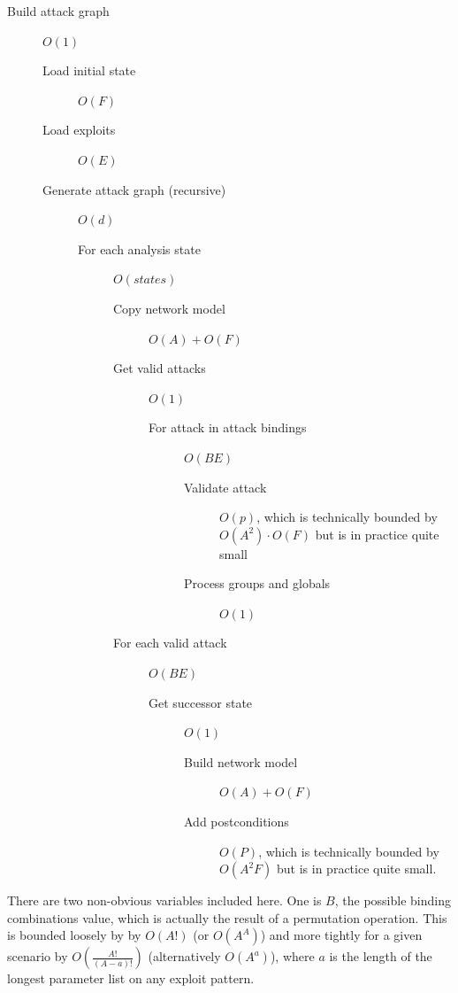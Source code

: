 \begin{description}
    \item[Build attack graph] $O(1)$
    \begin{description}
        \item[Load initial state] $O(F)$
        \item[Load exploits] $O(E)$
        \item[Generate attack graph (recursive)] $O(d)$
        \begin{description}
            \item[For each analysis state] $O(states)$
            \begin{description}
                \item[Copy network model] $O(A) + O(F)$
                \item[Get valid attacks] $O(1)$
                \begin{description}
                    \item[For attack in attack bindings] $O(B E)$
                    \begin{description}
                        \item[Validate attack] $O(p)$, which is
                            technically bounded by $O(A^2) \cdot O(F)$
                            but is in practice quite small
                        \item[Process groups and globals] $O(1)$
                    \end{description}
                \end{description}
                \item[For each valid attack] $O(B E)$
                \begin{description}
                    \item[Get successor state] $O(1)$
                    \begin{description}
                        \item[Build network model] $O(A) + O(F)$
                        \item[Add postconditions] $O(P)$, which is
                            technically bounded by $O(A^2 F)$
                            but is in practice quite small.
                    \end{description}
                \end{description}
            \end{description}
        \end{description}
    \end{description}
\end{description}
There are two non-obvious variables included here. One is 
$B$, the possible binding combinations value, which is
actually the result of a permutation operation. This is bounded loosely by
by $O(A!)$ (or $O(A^A)$) and more tightly for a given scenario by 
$O\left(\frac{A!}{(A-a)!}\right)$ (alternatively $O(A^a)$),
where $a$ is the length of the longest parameter list on any exploit pattern.

